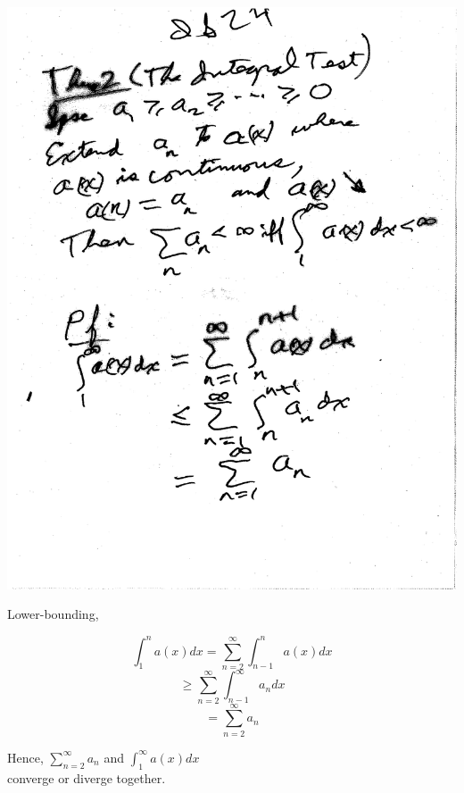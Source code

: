 \documentclass[10pt,a4paper]{article}
\begin{document}
{{\includegraphics[scale=.5]{Pages/IS_24}

\newpage

\noindent Lower-bounding,

$$ \int_{1}^{n} a(x) dx = \sum_{n=2}^{\infty} \int_{n-1}^{n} a(x) dx$$
$$ \geq \sum_{n=2}^{\infty} \int_{n-1}^{\infty} a_n dx $$
$$ = \sum_{n=2}^{\infty} a_n$$

\noindent Hence, $\sum_{n=2}^{\infty} a_n $ and $ \int_{1}^{\infty} a(x) dx$
\\ converge or diverge together.

}}
\end{document}
